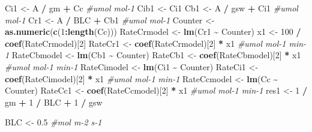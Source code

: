 \documentclass[
]{krantz}
\makeatletter
\newenvironment{Shaded}{\begin{snugshade}}{\end{snugshade}}
\newcommand{\CommentTok}[1]{\textcolor[rgb]{0.56,0.35,0.01}{\textit{#1}}}
\newcommand{\DecValTok}[1]{\textcolor[rgb]{0.00,0.00,0.81}{#1}}
\newcommand{\FloatTok}[1]{\textcolor[rgb]{0.00,0.00,0.81}{#1}}
\newcommand{\KeywordTok}[1]{\textcolor[rgb]{0.13,0.29,0.53}{\textbf{#1}}}
\newcommand{\NormalTok}[1]{#1}
\newcommand{\OperatorTok}[1]{\textcolor[rgb]{0.81,0.36,0.00}{\textbf{#1}}}
\newcommand{\StringTok}[1]{\textcolor[rgb]{0.31,0.60,0.02}{#1}}
\newenvironment{kframe}{%
\medskip{}
\setlength{\fboxsep}{.8em}
 \def\at@end@of@kframe{}%
 \ifinner\ifhmode%
  \def\at@end@of@kframe{\end{minipage}}%
  \begin{minipage}{\columnwidth}%
 \fi\fi%
 \def\FrameCommand##1{\hskip\@totalleftmargin \hskip-\fboxsep
 \colorbox{shadecolor}{##1}\hskip-\fboxsep
     \hskip-\linewidth \hskip-\@totalleftmargin \hskip\columnwidth}%
 \MakeFramed {\advance\hsize-\width
   \@totalleftmargin\z@ \linewidth\hsize
   \@setminipage}}%
 {\par\unskip\endMakeFramed%
 \at@end@of@kframe}
\renewenvironment{Shaded}{\begin{kframe}}{\end{kframe}}
\makeatother
\begin{document}
\begin{Shaded}
\begin{Highlighting}[]
\NormalTok{Ci1 \textless{}{-}}\StringTok{ }\NormalTok{A }\OperatorTok{/}\StringTok{ }\NormalTok{gm }\OperatorTok{+}\StringTok{ }\NormalTok{Cc }\CommentTok{\#umol mol{-}1}
\NormalTok{Cib1 \textless{}{-}}\StringTok{ }\NormalTok{Ci1}
\NormalTok{Cb1 \textless{}{-}}\StringTok{ }\NormalTok{A }\OperatorTok{/}\StringTok{ }\NormalTok{gsw }\OperatorTok{+}\StringTok{ }\NormalTok{Ci1 }\CommentTok{\#umol mol{-}1}
\NormalTok{Cr1 \textless{}{-}}\StringTok{ }\NormalTok{A }\OperatorTok{/}\StringTok{ }\NormalTok{BLC }\OperatorTok{+}\StringTok{ }\NormalTok{Cb1 }\CommentTok{\#umol mol{-}1}
\NormalTok{Counter \textless{}{-}}\StringTok{ }\KeywordTok{as.numeric}\NormalTok{(}\KeywordTok{c}\NormalTok{(}\DecValTok{1}\OperatorTok{:}\KeywordTok{length}\NormalTok{(Cc)))}
\NormalTok{RateCrmodel \textless{}{-}}\StringTok{ }\KeywordTok{lm}\NormalTok{(Cr1 }\OperatorTok{\textasciitilde{}}\StringTok{ }\NormalTok{Counter)}
\NormalTok{x1 \textless{}{-}}\StringTok{ }\DecValTok{100} \OperatorTok{/}\StringTok{ }\KeywordTok{coef}\NormalTok{(RateCrmodel)[}\DecValTok{2}\NormalTok{]}
\NormalTok{RateCr1 \textless{}{-}}\StringTok{ }\KeywordTok{coef}\NormalTok{(RateCrmodel)[}\DecValTok{2}\NormalTok{] }\OperatorTok{*}\StringTok{ }\NormalTok{x1 }\CommentTok{\#umol mol{-}1 min{-}1}
\NormalTok{RateCbmodel \textless{}{-}}\StringTok{ }\KeywordTok{lm}\NormalTok{(Cb1 }\OperatorTok{\textasciitilde{}}\StringTok{ }\NormalTok{Counter)}
\NormalTok{RateCb1 \textless{}{-}}\StringTok{ }\KeywordTok{coef}\NormalTok{(RateCbmodel)[}\DecValTok{2}\NormalTok{] }\OperatorTok{*}\StringTok{ }\NormalTok{x1 }\CommentTok{\#umol mol{-}1 min{-}1}
\NormalTok{RateCimodel \textless{}{-}}\StringTok{ }\KeywordTok{lm}\NormalTok{(Ci1 }\OperatorTok{\textasciitilde{}}\StringTok{ }\NormalTok{Counter)}
\NormalTok{RateCi1 \textless{}{-}}\StringTok{ }\KeywordTok{coef}\NormalTok{(RateCimodel)[}\DecValTok{2}\NormalTok{] }\OperatorTok{*}\StringTok{ }\NormalTok{x1 }\CommentTok{\#umol mol{-}1 min{-}1}
\NormalTok{RateCcmodel \textless{}{-}}\StringTok{ }\KeywordTok{lm}\NormalTok{(Cc }\OperatorTok{\textasciitilde{}}\StringTok{ }\NormalTok{Counter)}
\NormalTok{RateCc1 \textless{}{-}}\StringTok{ }\KeywordTok{coef}\NormalTok{(RateCcmodel)[}\DecValTok{2}\NormalTok{] }\OperatorTok{*}\StringTok{ }\NormalTok{x1 }\CommentTok{\#umol mol{-}1 min{-}1}
\NormalTok{res1 \textless{}{-}}\StringTok{ }\DecValTok{1} \OperatorTok{/}\StringTok{ }\NormalTok{gm }\OperatorTok{+}\StringTok{ }\DecValTok{1} \OperatorTok{/}\StringTok{ }\NormalTok{BLC }\OperatorTok{+}\StringTok{ }\DecValTok{1} \OperatorTok{/}\StringTok{ }\NormalTok{gsw}

\NormalTok{BLC \textless{}{-}}\StringTok{ }\FloatTok{0.5} \CommentTok{\#mol m{-}2 s{-}1}


\end{Highlighting}
\end{Shaded}
\end{document}

